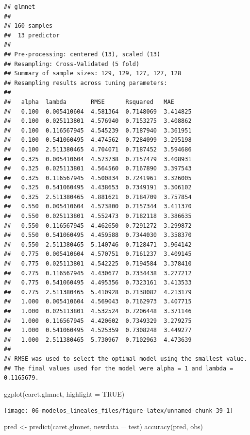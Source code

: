 \documentclass[
]{book}
\newenvironment{Shaded}{\begin{snugshade}}{\end{snugshade}}
\newcommand{\AttributeTok}[1]{\textcolor[rgb]{0.77,0.63,0.00}{#1}}
\newcommand{\ConstantTok}[1]{\textcolor[rgb]{0.00,0.00,0.00}{#1}}
\newcommand{\FunctionTok}[1]{\textcolor[rgb]{0.00,0.00,0.00}{#1}}
\newcommand{\NormalTok}[1]{#1}
\newcommand{\OtherTok}[1]{\textcolor[rgb]{0.56,0.35,0.01}{#1}}
\theoremstyle{break}
\theoremstyle{definition}
\theoremstyle{definition}
\theoremstyle{definition}
\theoremstyle{definition}
\theoremstyle{remark}
\begin{document}
\begin{verbatim}
## glmnet 
## 
## 160 samples
##  13 predictor
## 
## Pre-processing: centered (13), scaled (13) 
## Resampling: Cross-Validated (5 fold) 
## Summary of sample sizes: 129, 129, 127, 127, 128 
## Resampling results across tuning parameters:
## 
##   alpha  lambda       RMSE      Rsquared   MAE     
##   0.100  0.005410604  4.581364  0.7148069  3.414825
##   0.100  0.025113801  4.576940  0.7153275  3.408862
##   0.100  0.116567945  4.545239  0.7187940  3.361951
##   0.100  0.541060495  4.474562  0.7284099  3.295198
##   0.100  2.511380465  4.704071  0.7187452  3.594686
##   0.325  0.005410604  4.573738  0.7157479  3.408931
##   0.325  0.025113801  4.564560  0.7167890  3.397543
##   0.325  0.116567945  4.500834  0.7241961  3.326005
##   0.325  0.541060495  4.438653  0.7349191  3.306102
##   0.325  2.511380465  4.881621  0.7184709  3.757854
##   0.550  0.005410604  4.573800  0.7157344  3.411370
##   0.550  0.025113801  4.552473  0.7182118  3.386635
##   0.550  0.116567945  4.462650  0.7291272  3.299872
##   0.550  0.541060495  4.459588  0.7344030  3.358370
##   0.550  2.511380465  5.140746  0.7128471  3.964142
##   0.775  0.005410604  4.570751  0.7161237  3.409145
##   0.775  0.025113801  4.542225  0.7194584  3.378410
##   0.775  0.116567945  4.430677  0.7334438  3.277212
##   0.775  0.541060495  4.495356  0.7323161  3.413533
##   0.775  2.511380465  5.410928  0.7138082  4.213179
##   1.000  0.005410604  4.569043  0.7162973  3.407715
##   1.000  0.025113801  4.532524  0.7206448  3.371146
##   1.000  0.116567945  4.420602  0.7349329  3.279275
##   1.000  0.541060495  4.525359  0.7308248  3.449277
##   1.000  2.511380465  5.730967  0.7102963  4.473639
## 
## RMSE was used to select the optimal model using the smallest value.
## The final values used for the model were alpha = 1 and lambda = 0.1165679.
\end{verbatim}

\begin{Shaded}
\begin{Highlighting}[]
\FunctionTok{ggplot}\NormalTok{(caret.glmnet, }\AttributeTok{highlight =} \ConstantTok{TRUE}\NormalTok{)}
\end{Highlighting}
\end{Shaded}

\begin{center}\texttt{[image: 06-modelos\_lineales\_files/figure-latex/unnamed-chunk-39-1]} \end{center}

\begin{Shaded}
\begin{Highlighting}[]
\NormalTok{pred }\OtherTok{\textless{}{-}} \FunctionTok{predict}\NormalTok{(caret.glmnet, }\AttributeTok{newdata =}\NormalTok{ test)}
\FunctionTok{accuracy}\NormalTok{(pred, obs)}
\end{Highlighting}
\end{Shaded}
\end{document}
